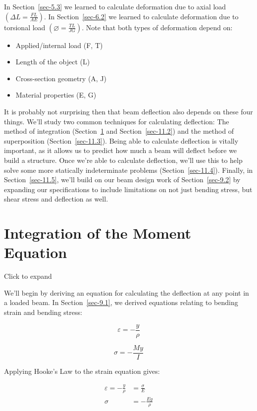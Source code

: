 \documentclass[
  letterpaper,
  DIV=11,
  numbers=noendperiod]{scrreprt}
\theoremstyle{definition}
\theoremstyle{remark}
\begin{document}
In Section~\ref{sec-5.3} we learned to calculate deformation due to
axial load \(\left(\Delta L=\frac{F L}{A E}\right)\). In
Section~\ref{sec-6.2} we learned to calculate deformation due to
torsional load \(\left(\varnothing=\frac{T L}{J G}\right)\). Note that
both types of deformation depend on:

\begin{itemize}
\item
  Applied/internal load (F, T)
\item
  Length of the object (L)
\item
  Cross-section geometry (A, J)
\item
  Material properties (E, G)
\end{itemize}

It is probably not surprising then that beam deflection also depends on
these four things. We'll study two common techniques for calculating
deflection: The method of integration (Section~\ref{sec-11.1} and
Section~\ref{sec-11.2}) and the method of superposition
(Section~\ref{sec-11.3}). Being able to calculate deflection is vitally
important, as it allows us to predict how much a beam will deflect
before we build a structure. Once we're able to calculate deflection,
we'll use this to help solve some more statically indeterminate problems
(Section~\ref{sec-11.4}). Finally, in Section~\ref{sec-11.5}, we'll
build on our beam design work of Section~\ref{sec-9.2} by expanding our
specifications to include limitations on not just bending stress, but
shear stress and deflection as well.

\section{Integration of the Moment Equation}\label{sec-11.1}

Click to expand

We'll begin by deriving an equation for calculating the deflection at
any point in a loaded beam. In Section~\ref{sec-9.1}, we derived
equations relating to bending strain and bending stress:

\[
\varepsilon=-\frac{y}{\rho}
\]

\[
\sigma=-\frac{My}{I}
\]

Applying Hooke's Law to the strain equation gives:

\[
\begin{aligned}
\varepsilon=-\frac{y}{\rho}&=\frac{\sigma}{E} \\
\sigma&=-\frac{Ey}{\rho}
\end{aligned}
\]
\end{document}
